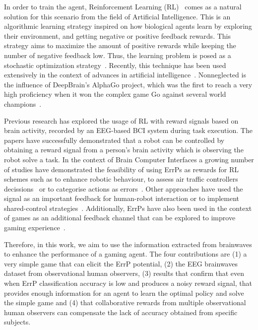\documentclass[journal]{IEEEtran}
\begin{document}
In order to train the agent, Reinforcement Learning (RL)~\cite{Sutton2018} comes as a natural solution for this scenario from the field of Artificial Intelligence.  This is an algorithmic learning strategy inspired on how biological agents learn by exploring their environment, and getting negative or positive feedback rewards.  This strategy aims to maximize the amount of positive rewards while keeping the number of negative feedback low.  Thus, the learning problem is  posed as a stochastic optimization strategy~\cite{Santos1999}.  Recently, this technique has been used extensively in the context of  advances in artificial intelligence~\cite{Nguyen2020}. Nonneglected is the influence of DeepBrain's AlphaGo project, which was the first to reach a very high proficiency when it won the complex game Go against several world champions~\cite{ALPHA-GO}.


Previous research has explored the usage of RL with reward signals based on brain activity, recorded by an EEG-based BCI system during task execution. The papers \cite{ROBOT-CONTROL-PAPER,Kim2017,Omedes2013} have successfully demonstrated that a robot can be controlled by obtaining a reward signal from a person's brain activity which is observing the robot solve a task.  In the context of Brain Computer Interfaces a growing number of studies have demonstrated the feasibility of using ErrPs as rewards for RL schemes such as to enhance robotic behaviour\cite{Luo2019}, to assess air traffic controllers decissions~\cite{Goh2019} or  to categorise actions as errors~\cite{Wirth2020}. Other approaches have used the signal as an important feedback for human-robot interaction or to implement shared-control strategies~\cite{Schiatti2018}.  Additionally, ErrPs have also been used in the context of games as an additional feedback channel that can be explored to improve gaming experience~\cite{Plass-OudeBos2010,kober2018bci}.  

Therefore, in this work, we aim to use the information extracted from brainwaves to enhance the performance of a gaming agent.   The four contributions  are (1) a very simple game that can elicit the ErrP potential, (2) the EEG brainwaves dataset from observational human observers, (3) results that confirm that even when ErrP classification accuracy is low and produces a noisy reward signal, that provides enough information for an agent to learn the optimal policy and solve the simple game and (4) that collaborative rewards from multiple observational human observers can compensate the lack of accuracy obtained from specific subjects.
\end{document}
